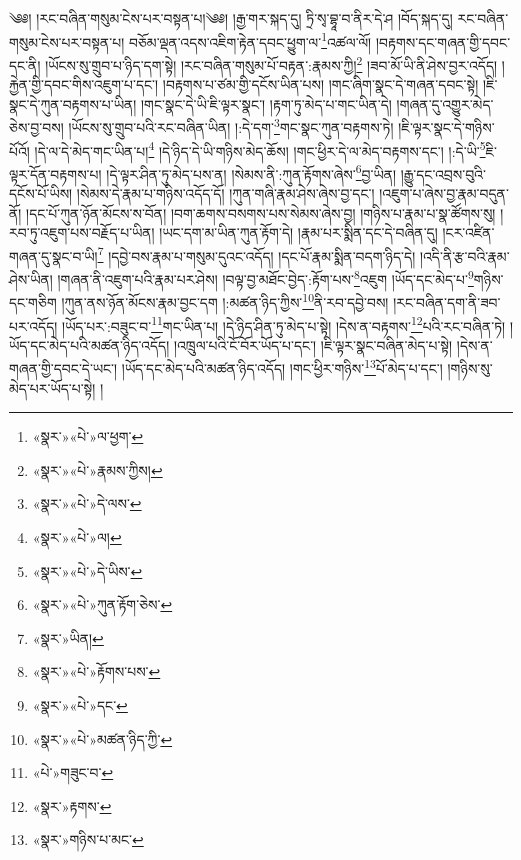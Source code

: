 ༄༅། །རང་བཞིན་གསུམ་ངེས་པར་བསྟན་པ།༄༅། །རྒྱ་གར་སྐད་དུ། ཏྲི་སྭ་བྷཱ་བ་ནིར་དེ་ཤ །བོད་སྐད་དུ། རང་བཞིན་གསུམ་ངེས་པར་བསྟན་པ། བཅོམ་ལྡན་འདས་འཇིག་རྟེན་དབང་ཕྱུག་ལ་\footnote{«སྣར་»«པེ་»ལ་ཕྱག་}འཚལ་ལོ། །བརྟགས་དང་གཞན་གྱི་དབང་དང་ནི། །ཡོངས་སུ་གྲུབ་པ་ཉིད་དག་སྟེ། །རང་བཞིན་གསུམ་པོ་བརྟན་:རྣམས་ཀྱི།\footnote{«སྣར་»«པེ་»རྣམས་ཀྱིས།} །ཟབ་མོ་ཡི་ནི་ཤེས་བྱར་འདོད། །རྐྱེན་གྱི་དབང་གིས་འཇུག་པ་དང་། །བརྟགས་པ་ཙམ་གྱི་དངོས་ཡིན་པས། །གང་ཞིག་སྣང་དེ་གཞན་དབང་སྟེ། །ཇི་སྣང་དེ་ཀུན་བརྟགས་པ་ཡིན། །གང་སྣང་དེ་ཡི་ཇི་ལྟར་སྣང་། །རྟག་ཏུ་མེད་པ་གང་ཡིན་དེ། །གཞན་དུ་འགྱུར་མེད་ཅེས་བྱ་བས། །ཡོངས་སུ་གྲུབ་པའི་རང་བཞིན་ཡིན། །:དེ་དག་\footnote{«སྣར་»«པེ་»དེ་ལས་}གང་སྣང་ཀུན་བརྟགས་ཏེ། །ཇི་ལྟར་སྣང་དེ་གཉིས་པོའོ། །དེ་ལ་དེ་མེད་གང་ཡིན་པ།\footnote{«སྣར་»«པེ་»ལ།} །དེ་ཉིད་དེ་ཡི་གཉིས་མེད་ཆོས། །གང་ཕྱིར་དེ་ལ་མེད་བརྟགས་དང་། །:དེ་ཡི་\footnote{«སྣར་»«པེ་»དེ་ཡིས་}ཇི་ལྟར་དོན་བརྟགས་པ། །དེ་ལྟར་ཤིན་ཏུ་མེད་པས་ན། །སེམས་ནི་:ཀུན་རྟོགས་ཞེས་\footnote{«སྣར་»«པེ་»ཀུན་རྟོག་ཅེས་}བྱ་ཡིན། །རྒྱུ་དང་འབྲས་བུའི་དངོས་པོ་ཡིས། །སེམས་དེ་རྣམ་པ་གཉིས་འདོད་དོ། །ཀུན་གཞི་རྣམ་ཤེས་ཞེས་བྱ་དང་། །འཇུག་པ་ཞེས་བྱ་རྣམ་བདུན་ནོ། །དང་པོ་ཀུན་ཉོན་མོངས་ས་བོན། །བག་ཆགས་བསགས་པས་སེམས་ཞེས་བྱ། །གཉིས་པ་རྣམ་པ་སྣ་ཚོགས་སུ། །རབ་ཏུ་འཇུག་པས་བརྗོད་པ་ཡིན། །ཡང་དག་མ་ཡིན་ཀུན་རྟོག་དེ། །རྣམ་པར་སྨིན་དང་དེ་བཞིན་དུ། །ངར་འཛིན་གཞན་དུ་སྣང་བ་ཡི།\footnote{«སྣར་»ཡིན།} །དབྱེ་བས་རྣམ་པ་གསུམ་དུའང་འདོད། །དང་པོ་རྣམ་སྨིན་བདག་ཉིད་དེ། །འདི་ནི་རྩ་བའི་རྣམ་ཤེས་ཡིན། །གཞན་ནི་འཇུག་པའི་རྣམ་པར་ཤེས། །བལྟ་བྱ་མཐོང་བྱེད་:རྟོག་པས་\footnote{«སྣར་»«པེ་»རྟོགས་པས་}འཇུག །ཡོད་དང་མེད་པ་\footnote{«སྣར་»«པེ་»དང་}གཉིས་དང་གཅིག །ཀུན་ནས་ཉོན་མོངས་རྣམ་བྱང་དག །:མཚན་ཉིད་ཀྱིས་\footnote{«སྣར་»«པེ་»མཚན་ཉིད་ཀྱི་}ནི་རབ་དབྱེ་བས། །རང་བཞིན་དག་ནི་ཟབ་པར་འདོད། །ཡོད་པར་:བཟུང་བ་\footnote{«པེ་»གཟུང་བ་}གང་ཡིན་པ། །དེ་ཉིད་ཤིན་ཏུ་མེད་པ་སྟེ། །དེས་ན་བརྟགས་\footnote{«སྣར་»རྟགས་}པའི་རང་བཞིན་ཏེ། །ཡོད་དང་མེད་པའི་མཚན་ཉིད་འདོད། །འཁྲུལ་པའི་ངོ་བོར་ཡོད་པ་དང་། །ཇི་ལྟར་སྣང་བཞིན་མེད་པ་སྟེ། །དེས་ན་གཞན་གྱི་དབང་དེ་ཡང་། །ཡོད་དང་མེད་པའི་མཚན་ཉིད་འདོད། །གང་ཕྱིར་གཉིས་\footnote{«སྣར་»གཉིས་པ་མང་}པོ་མེད་པ་དང་། །གཉིས་སུ་མེད་པར་ཡོད་པ་སྟེ། །

